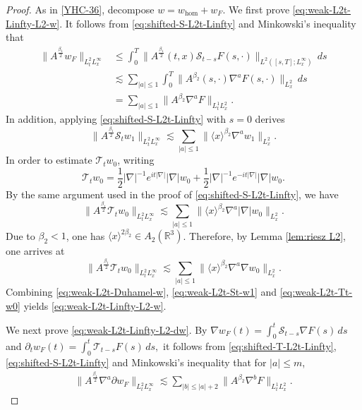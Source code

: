 \documentclass[11pt,twoside]{article}
\theoremstyle{plain}
\theoremstyle{definition}
\theoremstyle{assumption}
\numberwithin{equation}{section}
\begin{document}
\begin{proof}
		As in \eqref{YHC-36}, decompose $w=w_{\mathrm{hom}}+w_F$.
		We first prove \eqref{eq:weak-L2t-Linfty-L2-w}. It follows from \eqref{eq:shifted-S-L2t-Linfty} and Minkowski's inequality
        that
		\begin{equation}
			\label{eq:weak-L2t-Duhamel-w}
			\begin{aligned}
				\big\|
				A^{\frac{\beta_1}{2}}w_F
				\big\|_{L^2_tL^\infty_x}
				&\le
				\int_0^T
				\big\|
				A^{\frac{\beta_1}{2}}(t,x)
				\mathcal S_{t-s}F(s,\cdot)
				\big\|_{L^2([s,T];L^\infty_x)}
				\,ds
				\\
				&\lesssim
				\sum_{|a|\le1}
				\int_0^T
				\big\|
				A^{\beta_2}(s,\cdot)\nabla^aF(s,\cdot)
				\big\|_{L^2_x}\,ds
				\\
				&=
				\sum_{|a|\le1}
				\big\|
				A^{\beta_2}\nabla^aF
				\big\|_{L^1_tL^2_x}.
			\end{aligned}
		\end{equation}
		In addition, applying \eqref{eq:shifted-S-L2t-Linfty} with \(s=0\) derives
		\begin{equation}
			\label{eq:weak-L2t-St-w1}
			\big\|
			A^{\frac{\beta_1}{2}}\mathcal S_t w_1
			\big\|_{L^2_tL^\infty_x}
			\lesssim
			\sum_{|a|\le1}
			\big\|
			\langle x\rangle^{\beta_2}\nabla^a w_1
			\big\|_{L^2_x}.
		\end{equation}
		In order to estimate \(\mathcal T_t w_0\), writing
		\[
		\mathcal T_t w_0
		=\frac12|\nabla|^{-1}e^{it|\nabla|}|\nabla|w_0
		+\frac12|\nabla|^{-1}e^{-it|\nabla|}|\nabla|w_0.
		\]
	By the same argument used in the proof of \eqref{eq:shifted-S-L2t-Linfty}, we have
		\[
		\big\|
		A^{\frac{\beta_1}{2}}\mathcal T_t w_0
		\big\|_{L^2_tL^\infty_x}
		\lesssim
		\sum_{|a|\le1}
		\big\|
		\langle x\rangle^{\beta_2}\nabla^a|\nabla|w_0
		\big\|_{L^2_x}.
		\]
		Due to \(\beta_2<1\), one has \(\langle x\rangle^{2\beta_2}\in A_2(\mathbb R^3)\).
		Therefore, by Lemma \ref{lem:riesz L2}, one arrives at
		\begin{equation}
			\label{eq:weak-L2t-Tt-w0}
			\big\|
			A^{\frac{\beta_1}{2}}\mathcal T_t w_0
			\big\|_{L^2_tL^\infty_x}
			\lesssim
			\sum_{|a|\le1}
			\big\|
			\langle x\rangle^{\beta_2}
			\nabla^a\nabla w_0
			\big\|_{L^2_x}.
		\end{equation}
		Combining \eqref{eq:weak-L2t-Duhamel-w},
		\eqref{eq:weak-L2t-St-w1} and
		\eqref{eq:weak-L2t-Tt-w0} yields
		\eqref{eq:weak-L2t-Linfty-L2-w}.
		
		We next prove \eqref{eq:weak-L2t-Linfty-L2-dw}. By
		$\nabla w_F(t)
		=\int_0^t
		\mathcal S_{t-s}\nabla F(s)\,ds$
		and
		$
		\partial_t w_F(t)
		=
		\int_0^t
		\mathcal T_{t-s}F(s)\,ds,
		$
		it follows from \eqref{eq:shifted-T-L2t-Linfty}, \eqref{eq:shifted-S-L2t-Linfty}
		 and Minkowski's inequality that for \(|a|\le m\),
		\begin{equation}
			\label{eq:weak-L2t-Duhamel-dw}
			\begin{aligned}
				\big\|
				A^{\frac{\beta_1}{2}}\nabla^a\partial w_F
				\big\|_{L^2_tL^\infty_x}
				\lesssim
				\sum_{|b|\le |a|+2}
				\big\|
				A^{\beta_2}\nabla^bF
				\big\|_{L^1_tL^2_x}.
			\end{aligned}
		\end{equation}
		

\end{proof}
\end{document}

